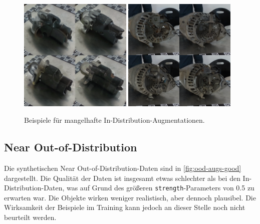 \begin{figure}
	\centering
	\includegraphics[width=0.48\textwidth]{figure_results_id-augs_bad_1.png}%
	\hspace{0.02\textwidth}\includegraphics[width=0.48\textwidth]{figure_results_id-augs_bad_2.png}
	\caption{Beispiele für mangelhafte In-Distribution-Augmentationen.}
	\label{fig:id-augs-bad}
\end{figure}

\subsection{Near Out-of-Distribution} \label{subsec:da-fusion-ood-results}

Die synthetischen Near Out-of-Distribution-Daten sind in \autoref{fig:ood-augs-good} dargestellt. Die Qualität der Daten ist insgesamt etwas schlechter als bei den In-Distribution-Daten, was auf Grund des größeren \lstinline{strength}-Parameters von 0.5 zu erwarten war. Die Objekte wirken weniger realistisch, aber dennoch plausibel. Die Wirksamkeit der Beispiele im Training kann jedoch an dieser Stelle noch nicht beurteilt werden.

